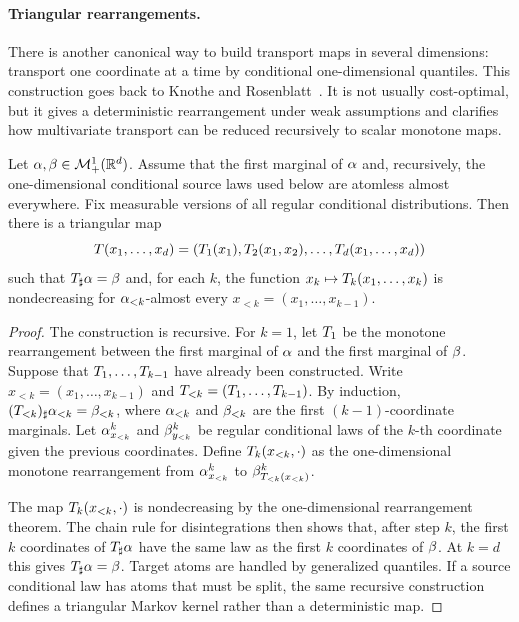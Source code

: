 \paragraph{Triangular rearrangements.}

There is another canonical way to build transport maps in several dimensions: transport one coordinate at a time by conditional one-dimensional quantiles. This construction goes back to Knothe and Rosenblatt~\cite{Knothe1957,Rosenblatt1952}. It is not usually cost-optimal, but it gives a deterministic rearrangement under weak assumptions and clarifies how multivariate transport can be reduced recursively to scalar monotone maps.

\begin{prop}\label{prop-knothe-rosenblatt}
	Let $\alpha,\beta\in\mathcal{M}_+^1(\mathbb{R}^d)$. Assume that the first marginal of $\alpha$ and, recursively, the one-dimensional conditional source laws used below are atomless almost everywhere. Fix measurable versions of all regular conditional distributions. Then there is a triangular map
	\[
		T(x_1,\ldots,x_d)
		=
		(T_1(x_1),T_2(x_1,x_2),\ldots,T_d(x_1,\ldots,x_d))
	\]
	such that $T_\sharp\alpha=\beta$ and, for each $k$, the function $x_k\mapsto T_k(x_1,\ldots,x_k)$ is nondecreasing for $\alpha_{<k}$-almost every $x_{<k}=(x_1,\ldots,x_{k-1})$.
\end{prop}
\begin{proof}
	The construction is recursive. For $k=1$, let $T_1$ be the monotone rearrangement between the first marginal of $\alpha$ and the first marginal of $\beta$. Suppose that $T_1,\ldots,T_{k-1}$ have already been constructed. Write $x_{<k}=(x_1,\ldots,x_{k-1})$ and $T_{<k}=(T_1,\ldots,T_{k-1})$. By induction, $(T_{<k})_\sharp\alpha_{<k}=\beta_{<k}$, where $\alpha_{<k}$ and $\beta_{<k}$ are the first $(k-1)$-coordinate marginals. Let $\alpha^k_{x_{<k}}$ and $\beta^k_{y_{<k}}$ be regular conditional laws of the $k$-th coordinate given the previous coordinates. Define $T_k(x_{<k},\cdot)$ as the one-dimensional monotone rearrangement from $\alpha^k_{x_{<k}}$ to $\beta^k_{T_{<k}(x_{<k})}$.

	The map $T_k(x_{<k},\cdot)$ is nondecreasing by the one-dimensional rearrangement theorem. The chain rule for disintegrations then shows that, after step $k$, the first $k$ coordinates of $T_\sharp\alpha$ have the same law as the first $k$ coordinates of $\beta$. At $k=d$ this gives $T_\sharp\alpha=\beta$. Target atoms are handled by generalized quantiles. If a source conditional law has atoms that must be split, the same recursive construction defines a triangular Markov kernel rather than a deterministic map.
\end{proof}

